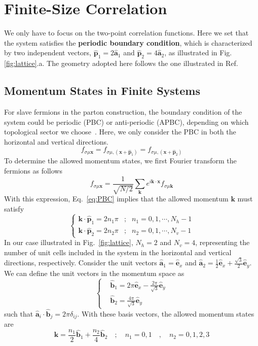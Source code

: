 \documentclass[12font]{article}
\theoremstyle{definition}
\newcommand{\bo}[1]{\mathbf{#1}}
\begin{document}
\section{Finite-Size Correlation}
We only have to focus on the two-point correlation functions. Here we set that the system satisfies the \textbf{periodic boundary condition}, which is characterized by two independent vectors, $\hat{\bo{p}}_1 = 2\hat{\bo{a}}_1$ and $\hat{\bo{p}}_2 = 4\hat{\bo{a}}_2$, as illustrated in Fig.\ref{fig:lattice}.a. The geometry adopted here follows the one illustrated in Ref.~\cite{Pedrocchi-Chesi-Loss_2011}

\subsection{Momentum States in Finite Systems}
For slave fermions in the parton construction, the boundary condition of the system could be periodic (PBC) or anti-periodic (APBC), depending on which topological sector we choose~\cite{Kou-Levin-Wen_2008}. Here, we only consider the PBC in both the horizontal and vertical directions. 
\begin{equation}\label{eq:PBC}
    f_{\sigma\mu\bo{x}} = f_{\sigma\mu,(\bo{x} + \hat{\bo{p}}_1)} = f_{\sigma\mu,(\bo{x} + \hat{\bo{p}}_2)}
\end{equation}
To determine the allowed momentum states, we first Fourier transform the fermions as follows
\[
f_{\sigma\mu\bo{x}} = \frac{1}{\sqrt{N/2}}\sum_{\bo{k}} e^{i\bo{k}\cdot\bo{x}} f_{\sigma\mu\bo{k}}
\]
With this expression, Eq.~\eqref{eq:PBC} implies that the allowed momentum $\bo{k}$ must satisfy
\begin{equation}\label{eq:condition-init}
    \left\{
    \begin{array}{lll}
        \bo{k}\cdot\hat{\bo{p}}_1 = 2n_1\pi & ; & n_1 = 0,1,\cdots,N_h-1\\
        \bo{k}\cdot\hat{\bo{p}}_2 = 2n_2\pi & ; & n_2 = 0,1,\cdots,N_v-1
    \end{array}
    \right.
\end{equation}
In our case illustrated in Fig.~\ref{fig:lattice}, $N_h=2$ and $N_v = 4$, representing the number of unit cells included in the system in the horizontal and vertical directions, respectively. Consider the unit vectors $\hat{\bo{a}}_1 = \hat{\bo{e}}_x$ and $\hat{\bo{a}}_2 = \frac{1}{2}\hat{\bo{e}}_x + \frac{\sqrt{3}}{2}\hat{\bo{e}}_y$. We can define the unit vectors in the momentum space as 
\[
\left\{
\begin{aligned}
& \hat{\bo{b}}_1 =  2\pi\hat{\bo{e}}_x - \frac{2\pi}{\sqrt{3}}\hat{\bo{e}}_y\\
& \hat{\bo{b}}_2 = \frac{4\pi}{\sqrt{3}}\hat{\bo{e}}_y
\end{aligned}
\right.
\]
such that $\hat{\bo{a}}_i\cdot\hat{\bo{b}}_j = 2\pi \delta_{ij}$. With these basis vectors, the allowed momentum states are
\begin{equation}\label{eq:allowed-momentum}
    \bo{k} = \frac{n_1}{2}\hat{\bo{b}}_1 + \frac{n_2}{4}\hat{\bo{b}}_2 \quad ; \quad n_1=0,1 \quad,\quad n_2=0,1,2,3
\end{equation}
\end{document}
